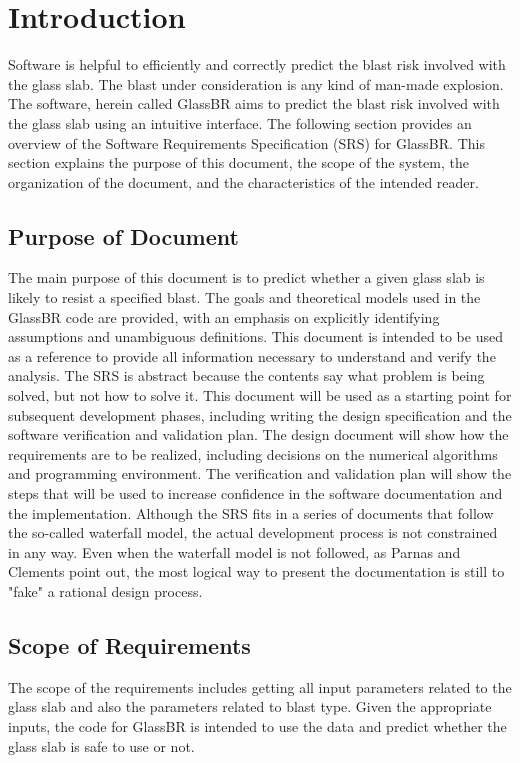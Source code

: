 \documentclass[12pt]{article}
\begin{document}
\section{Introduction}
\label{Sec:Intr}
Software is helpful to efficiently and correctly predict the blast risk involved with the glass slab. The blast under consideration is any kind of man-made explosion. The software, herein called GlassBR aims to predict the blast risk involved with the glass slab using an intuitive interface.
The following section provides an overview of the Software Requirements Specification (SRS) for GlassBR. This section explains the purpose of this document, the scope of the system, the organization of the document, and the characteristics of the intended reader.
\subsection{Purpose of Document}
\label{Sec:PurpofDocu}
The main purpose of this document is to predict whether a given glass slab is likely to resist a specified blast. The goals and theoretical models used in the GlassBR code are provided, with an emphasis on explicitly identifying assumptions and unambiguous definitions. This document is intended to be used as a reference to provide all information necessary to understand and verify the analysis. The SRS is abstract because the contents say what problem is being solved, but not how to solve it.
This document will be used as a starting point for subsequent development phases, including writing the design specification and the software verification and validation plan. The design document will show how the requirements are to be realized, including decisions on the numerical algorithms and programming environment. The verification and validation plan will show the steps that will be used to increase confidence in the software documentation and the implementation. Although the SRS fits in a series of documents that follow the so-called waterfall model, the actual development process is not constrained in any way. Even when the waterfall model is not followed, as Parnas and Clements point out, the most logical way to present the documentation is still to "fake" a rational design process.
\subsection{Scope of Requirements}
\label{Sec:ScopofRequ}
The scope of the requirements includes getting all input parameters related to the glass slab and also the parameters related to blast type. Given the appropriate inputs, the code for GlassBR is intended to use the data and predict whether the glass slab is safe to use or not.
\end{document}
